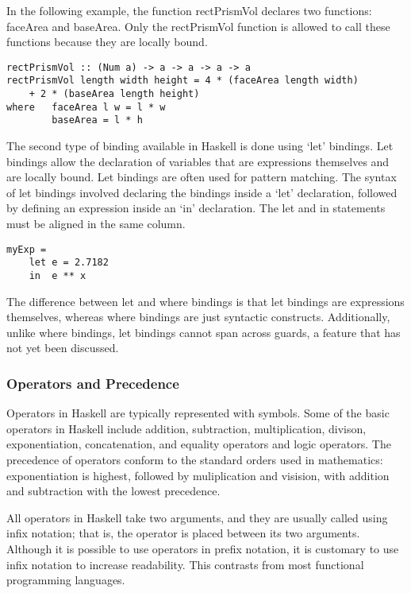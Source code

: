 \documentclass[titlepage,12pt]{article}
\begin{document}
In the following example, the function rectPrismVol declares two functions: faceArea and baseArea. Only the rectPrismVol 
function is allowed to call these functions because they are locally bound. 

\begin{verbatim}
rectPrismVol :: (Num a) -> a -> a -> a -> a
rectPrismVol length width height = 4 * (faceArea length width)
    + 2 * (baseArea length height)
where   faceArea l w = l * w
        baseArea = l * h
\end{verbatim}

The second type of binding available in Haskell is done using `let' bindings. Let bindings allow the declaration of 
variables that are expressions themselves and are locally bound. Let bindings are often used for pattern matching. 
The syntax of let bindings involved declaring the bindings inside a `let' declaration, followed by defining an 
expression inside an `in' declaration. The let and in statements must be aligned in the same column. 

\begin{verbatim}
myExp =
    let e = 2.7182
    in  e ** x
\end{verbatim}

The difference between let and where bindings is that let bindings are expressions themselves, whereas where 
bindings are just syntactic constructs. Additionally, unlike where bindings, let bindings cannot span across guards, 
a feature that has not yet been discussed.

\subsubsection{Operators and Precedence}

Operators in Haskell are typically represented with symbols. Some of the basic operators in Haskell include addition, 
subtraction, multiplication, divison, exponentiation, concatenation, and equality operators and logic operators. The 
precedence of operators conform to the standard orders used in mathematics: exponentiation is highest, followed by 
muliplication and visision, with addition and subtraction with the lowest precedence.  

All operators in Haskell take two arguments, and they are usually called using infix notation; that is, the operator is 
placed between its two arguments. Although it is possible to use operators in prefix notation, it is customary to use 
infix notation to increase readability. This contrasts from most functional programming languages. 
\end{document}
